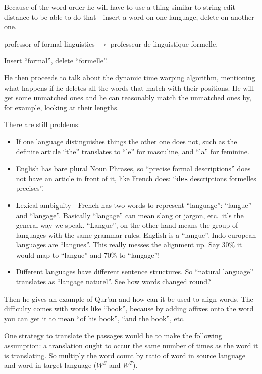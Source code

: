 Because of the word order he will have to use a thing similar to string-edit
distance to be able to do that - insert a word on one language, delete on
another one.

professor of formal linguistics $\rightarrow$ professeur de linguistique 
formelle.

Insert ``formal'', delete ``formelle''.

He then proceeds to talk about the dynamic time warping algorithm, mentioning 
what happens if he deletes all the words that match with their positions. He 
will get some unmatched ones and he can reasonably match the unmatched ones by, 
for example, looking at their lengths.

There are still problems: 
\begin{itemize}
	\item If one language distinguishes things the other one does not, such as 
	the definite article ``the'' translates to ``le'' for masculine, and ``la''
	for feminine.
	\item English has bare plural Noun Phrases, so ``precise formal 
	descriptions'' does not have an article in front of it, like French does:
	``\textbf{des} descriptions formelles precises''.
	\item Lexical ambiguity - French has two words to represent ``language'':
	``langue'' and ``langage''. 
	Basically ``langage'' can mean slang or jargon, etc.\, it's the general way 
	we speak. ``Langue'', on the other hand means the group of languages with 
	the same grammar rules. English is a ``langue''. Indo-european languages are
	``langues''. This really messes the alignment up. Say 30\% it would map to 
	``langue'' and 70\% to ``langage''!
	\item Different languages have different sentence structures. So ``natural 
	language'' translates as ``langage naturel''. See how words changed round?
\end{itemize}

Then he gives an example of Qur'an and how can it be used to align words. The 
difficulty comes with words like ``book'', because by adding affixes onto the
word you can get it to mean ``of his book'', ``and the book'', etc.

One strategy to translate the passages would be to make the following 
assumption: a translation ought to occur the same number of times as the word it
 is translating. So multiply the word count by ratio of word in source language 
 and word in target language ($W^S$ and $W^T$). 

